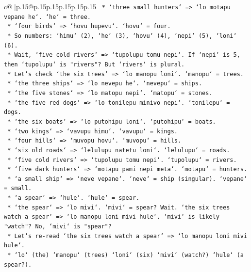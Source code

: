 \documentclass{article}
\begin{document}
{\begin{supertabular}{c@{$\;$}|p{.15\linewidth}@{}p{.15\linewidth}p{.15\linewidth}p{.15\linewidth}p{.15\linewidth}p{.15\linewidth}}
{{{\texttt{            *   `three small hunters` => `lo motapu vepane he`. `he` = three.} \\
\texttt{            *   `four birds` => `hovu hupevu`. `hovu` = four.} \\
\texttt{            *   So numbers: `himu` (2), `he` (3), `hovu` (4), `nepi` (5), `loni` (6).} \\
\texttt{            *   Wait, `five cold rivers` => `tupolupu tomu nepi`. If `nepi` is 5, then `tupolupu` is "rivers"? But `rivers` is plural.} \\
\texttt{            *   Let's check `the six trees` => `lo manopu loni`. `manopu` = trees.} \\
\texttt{            *   `the three ships` => `lo nevepu he`. `nevepu` = ships.} \\
\texttt{            *   `the five stones` => `lo matopu nepi`. `matopu` = stones.} \\
\texttt{            *   `the five red dogs` => `lo tonilepu minivo nepi`. `tonilepu` = dogs.} \\
\texttt{            *   `the six boats` => `lo putohipu loni`. `putohipu` = boats.} \\
\texttt{            *   `two kings` => `vavupu himu`. `vavupu` = kings.} \\
\texttt{            *   `four hills` => `muvopu hovu`. `muvopu` = hills.} \\
\texttt{            *   `six old roads` => `lelulupu natetu loni`. `lelulupu` = roads.} \\
\texttt{            *   `five cold rivers` => `tupolupu tomu nepi`. `tupolupu` = rivers.} \\
\texttt{            *   `five dark hunters` => `motapu pami nepi meta`. `motapu` = hunters.} \\
\texttt{            *   `a small ship` => `neve vepane`. `neve` = ship (singular). `vepane` = small.} \\
\texttt{            *   `a spear` => `hule`. `hule` = spear.} \\
\texttt{            *   `the spear` => `lo mivi`. `mivi` = spear? Wait. `the six trees watch a spear` => `lo manopu loni mivi hule`. `mivi` is likely "watch"? No, `mivi` is "spear"?} \\
\texttt{            *   Let's re{-}read `the six trees watch a spear` => `lo manopu loni mivi hule`.} \\
\texttt{                *   `lo` (the) `manopu` (trees) `loni` (six) `mivi` (watch?) `hule` (a spear?).} \\
}}}
\end{supertabular}}
\end{document}
